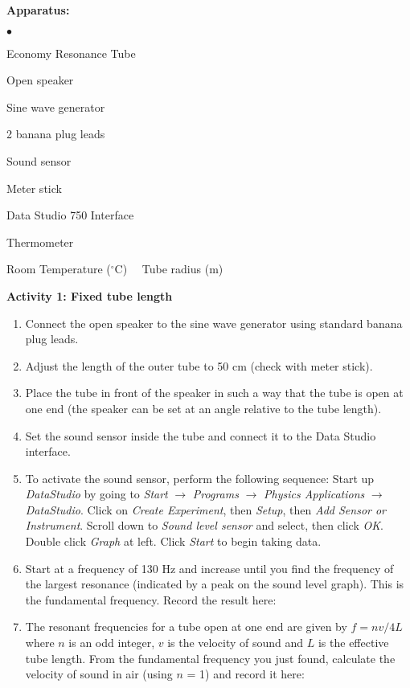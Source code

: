 {\noindent \bf Apparatus:} \begin{list}{$\bullet$}{\itemsep0pt }

\item Economy Resonance Tube 
\item Open speaker
\item Sine wave generator
\item 2 banana plug leads
\item Sound sensor
\item Meter stick
\item Data Studio 750 Interface
\item Thermometer

\end{list}

\noindent Room Temperature ($^\circ$C) \hrulefill \ \  Tube radius (m) \hrulefill

\vspace{5mm}

{\noindent \bf Activity 1: Fixed tube length} \begin{enumerate}

\item Connect the open speaker to the sine wave generator using standard banana plug leads.

\item Adjust the length of the outer tube to 50 cm (check with meter stick).

\item Place the tube in front of the speaker in such a way that the tube is open at one end (the speaker can be set at an angle relative to the tube length).

\item Set the sound sensor inside the tube and connect it to the Data Studio interface.

\item To activate the sound sensor, perform the following sequence:  Start up \textit{DataStudio} by going to \textit{Start} $\rightarrow$ \textit{Programs} $\rightarrow$ \textit{Physics Applications} $\rightarrow$ \textit{DataStudio}.
Click on \textit{Create Experiment}, then \textit{Setup}, then \textit{Add Sensor or Instrument}. Scroll down to \textit{Sound level sensor} and select, then click \textit{OK}. Double click \textit{Graph} at left. Click \textit{Start} to begin taking data.

\item Start at a frequency of 130 Hz and increase until you find the frequency of the largest resonance (indicated by a peak on the sound level graph).  This is the fundamental frequency.  Record the result here:\vspace{10mm}

\item The resonant frequencies for a tube open at one end are given by $f=nv/4L$ where $n$ is an odd integer, $v$ is the velocity of sound and $L$ is the effective tube length.  From the fundamental frequency you just found, calculate the velocity of sound in air (using $n$ = 1) and record it here:\vspace{15mm}

\end{enumerate}

